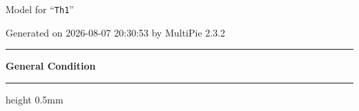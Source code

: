 \documentclass[fleqn,10pt,landscape]{jsarticle}
\begin{document}
\setcounter{MaxMatrixCols}{32}

\renewcommand{\tablename}{Table~}
\renewcommand{\figurename}{Figure~}
\setlength{\baselineskip}{16pt}
\setlength{\parindent}{0pt}
\setlength{\mathindent}{0pt}
\footnotesize
\begin{center}
\LARGE
Model for ``\texttt{Th1}''
\end{center}
\begin{flushright}
Generated on 2026-08-07 20:30:53 by MultiPie 2.3.2
\end{flushright}
\setlength{\baselineskip}{16pt}
\footnotesize
\vspace{5mm}
\noindent \rule[0.5mm]{5mm}{0.5mm}\hspace{3mm}\textbf{General Condition}\hspace{3mm}\leaders\hrule height 0.5mm\hfill\kern0pt
\vspace{3mm}
\end{document}

